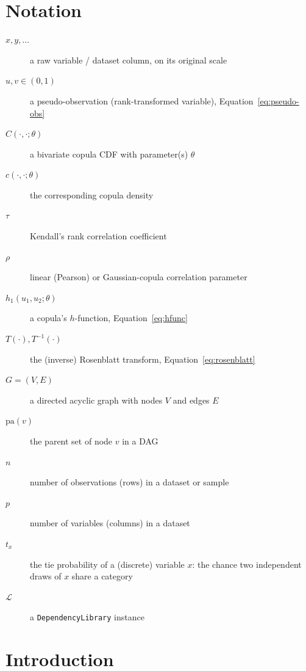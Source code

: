 \documentclass[
  english,
  class=report,
  accentcolor=2c,
  marginpar=false,
  parskip=half-,
  fontsize=11pt,
  ruledheaders=false,
  pdfa=false,
  IMRAD=false,
  thesis={type=master}
]{tudapub}
\begin{document}
\chapter*{Notation}
\begin{description}
  \item[$x, y, \dots$] a raw variable / dataset column, on its original scale
  \item[$u, v \in (0,1)$] a pseudo-observation (rank-transformed variable), Equation~\ref{eq:pseudo-obs}
  \item[$C(\cdot,\cdot;\theta)$] a bivariate copula CDF with parameter(s) $\theta$
  \item[$c(\cdot,\cdot;\theta)$] the corresponding copula density
  \item[$\tau$] Kendall's rank correlation coefficient
  \item[$\rho$] linear (Pearson) or Gaussian-copula correlation parameter
  \item[$h_1(u_1,u_2;\theta)$] a copula's $h$-function, Equation~\ref{eq:hfunc}
  \item[$T(\cdot), T^{-1}(\cdot)$] the (inverse) Rosenblatt transform, Equation~\ref{eq:rosenblatt}
  \item[$G = (V,E)$] a directed acyclic graph with nodes $V$ and edges $E$
  \item[$\text{pa}(v)$] the parent set of node $v$ in a DAG
  \item[$n$] number of observations (rows) in a dataset or sample
  \item[$p$] number of variables (columns) in a dataset
  \item[$t_x$] the tie probability of a (discrete) variable $x$: the chance two independent draws of $x$ share a category
  \item[$\mathcal{L}$] a \texttt{DependencyLibrary} instance
\end{description}

\chapter{Introduction}
\label{chap:intro}
\end{document}
